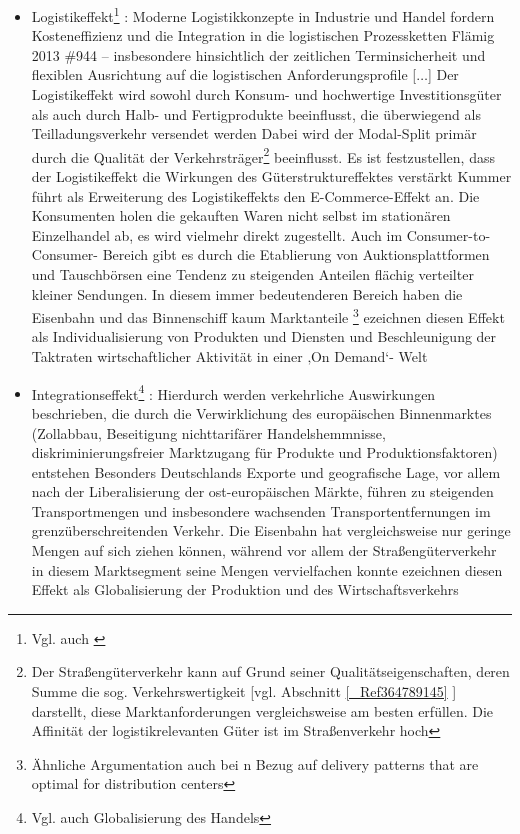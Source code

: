 \begin{itemize}
%
   \item Logistikeffekt\footnote{%
 Vgl. auch  \autocites[][]{bib.876}
}%
: Moderne Logistikkonzepte in Industrie und Handel fordern Kosteneffizienz und die Integration in die logistischen Prozessketten {Flämig 2013 \#944} – \glqq insbesondere hinsichtlich der zeitlichen Terminsicherheit und flexiblen Ausrichtung auf die logistischen Anforderungsprofile [$\ldots$]\grqq   \autocites[][]{bib.739} Der Logistikeffekt wird sowohl durch Konsum- und hochwertige Investitionsgüter als auch durch Halb- und Fertigprodukte beeinflusst, die überwiegend als Teilladungsverkehr versendet werden  \autocites[][]{bib.739} Dabei wird der Modal-Split primär durch die Qualität der Verkehrsträger\footnote{%
 \glqq Der Straßengüterverkehr kann auf Grund seiner Qualitätseigenschaften, deren Summe die sog. Verkehrswertigkeit [vgl. Abschnitt \autoref{_Ref364789145} ] darstellt, diese Marktanforderungen vergleichsweise am besten erfüllen. Die Affinität der logistikrelevanten Güter ist im Straßenverkehr hoch\grqq   \autocites[][]{bib.739}
}%
 beeinflusst. Es ist festzustellen, dass \glqq der Logistikeffekt die Wirkungen des Güterstruktureffektes verstärkt\grqq   \autocites[][]{bib.739} Kummer führt als Erweiterung des Logistikeffekts den E-Commerce-Effekt an. \glqq Die Konsumenten holen die gekauften Waren nicht selbst im stationären Einzelhandel ab, es wird vielmehr direkt zugestellt. Auch im Consumer-to-Consumer- Bereich gibt es durch die Etablierung von Auktionsplattformen und Tauschbörsen eine Tendenz zu steigenden Anteilen flächig verteilter kleiner Sendungen. In diesem immer bedeutenderen Bereich haben die Eisenbahn und das Binnenschiff kaum Marktanteile\grqq   \autocites[][]{bib.562}
\label{_Toc347467540}\footnote{%
 Ähnliche Argumentation auch bei  \citeauthor{bib.969} n Bezug auf \glqq delivery patterns that are optimal for distribution centers\grqq   \autocites[][]{bib.969}
}%
  \citeauthor{bib.371} ezeichnen diesen Effekt als \glqq Individualisierung von Produkten und Diensten und Beschleunigung der Taktraten wirtschaftlicher Aktivität in einer ‚On Demand‘- Welt\grqq   \autocites[][]{bib.371}
   \item Integrationseffekt\footnote{%
 Vgl. auch \glqq Globalisierung des Handels\grqq   \autocites[][]{bib.876}
}%
: Hierdurch werden verkehrliche Auswirkungen beschrieben, die durch die Verwirklichung des europäischen Binnenmarktes (Zollabbau, Beseitigung nichttarifärer Handelshemmnisse, diskriminierungsfreier Marktzugang für Produkte und Produktionsfaktoren) entstehen  \autocites[][]{bib.739} Besonders Deutschlands Exporte und geografische Lage, vor allem nach der Liberalisierung der ost-europäischen Märkte, führen zu steigenden Transportmengen und insbesondere wachsenden Transportentfernungen im grenzüberschreitenden Verkehr.  \autocites[][]{bib.739} Die Eisenbahn hat vergleichsweise nur geringe Mengen auf sich ziehen können, während vor allem der Straßengüterverkehr in diesem Marktsegment seine Mengen vervielfachen konnte  \autocites[][]{bib.739}  \citeauthor{bib.371} ezeichnen diesen Effekt als \glqq Globalisierung der Produktion und des Wirtschaftsverkehrs\grqq   \autocites[][]{bib.371}
%
\end{itemize}


